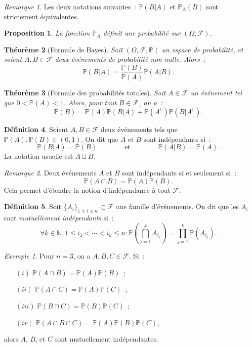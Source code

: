 \documentclass{article}
\newcommand{\N}{\mathbb N}
\renewcommand{\P}{\mathbb P}
\newcommand{\espproba}[3]{\left(#1, #2, #3\right)}  %
\newcommand{\Ofp}{\espproba \Omega{\mathcal F}\P}  %
\newtheorem{thm}{Théorème}[section]
\newtheorem{prp}[thm]{Proposition}
\theoremstyle{definition}
\newtheorem{déf}[thm]{Définition}
\theoremstyle{remark}
\newtheorem*{rmq}{Remarque}
\newtheorem{ex}{Exemple}
\begin{document}
		\begin{rmq} Les deux notations suivantes~: $\P(B | A)$ et $\P_A(B)$ sont strictement équivalentes. \end{rmq}

		\begin{prp} La fonction $\P_A$ définit une probabilité sur $(\Omega, \mathcal F)$. \end{prp}

		\begin{thm}[Formule de Bayes] Soit $\Ofp$ un espace de probabilité, et soient $A, B \in \mathcal F$ deux événements de probabilité non nulle. Alors~:
		\[\P(B | A) = \frac {\P(B)}{\P(A)}\P(A | B).\]
		\end{thm}

		\begin{thm}[Formule des probabilités totales] Soit $A \in \mathcal F$ un événement tel que $0 < \P(A) < 1$. Alors, pour tout $B \in \mathcal F$, on a~:
		\[\P(B) = \P(A)\P(B|A) + \P(A^\complement)\P(B|A^\complement).\]
		\end{thm}

		\begin{déf} Soient $A, B \in \mathcal F$ deux événements tels que $\P(A), \P(B) \in (0, 1)$. On dit que $A$ et $B$ sont indépendants si~:
		\[\P(B|A) = \P(B)\qquad\qquad\text{et}\qquad\qquad\P(A|B)=\P(A).\]
		La notation usuelle est $A \sqcup B$.
		\end{déf}

		\begin{rmq} Deux événements $A$ et $B$ sont indépendants si et seulement si~:
		\[\P(A \cap B) = \P(A)\P(B).\]
		Cela permet d'étendre la notion d'indépendance à tout $\mathcal F$. \end{rmq}

		\begin{déf} Soit $\{A_i\}_{1 \leq i \leq n} \subset \mathcal F$ une famille d'événements. On dit que les $A_i$ sont \emph{mutuellement indépendants} si~:
		\[\forall k \in \N, 1 \leq i_1 < \dotsb < i_k \leq n : \P\left(\bigcap_{j=1}^kA_{i_j}\right) = \prod_{j=1}^k\P(A_{i_j}).\]
		\end{déf}

		\begin{ex} Pour $n=3$, on a $A, B, C \in \mathcal F$. Si~:
		\begin{itemize}
			\item[$(i)$] $\P(A \cap B) = \P(A)\P(B)$~;
			\item[$(ii)$] $\P(A \cap C) = \P(A)\P(C)$~;
			\item[$(iii)$] $\P(B \cap C) = \P(B)\P(C)$~;
			\item[$(iv)$] $\P(A \cap B \cap C) = \P(A)\P(B)\P(C)$,
		\end{itemize}
		alors $A$, $B$, et $C$ sont mutuellement indépendantes.
		\end{ex}
\end{document}
